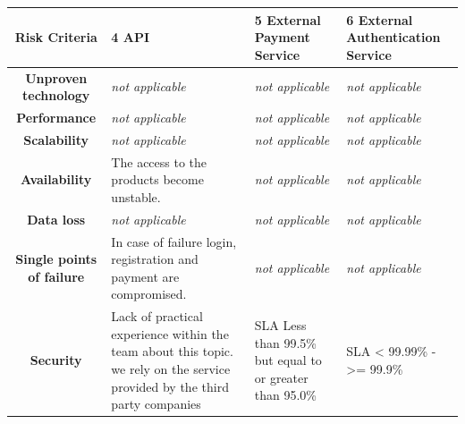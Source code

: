 \begin{table}[H]
    \begin{tabularx}{\textwidth}{|c|X|X|X|}
        \toprule
        \textbf{Risk Criteria} & \textbf{4 API} & \textbf{5 External Payment Service} & \textbf{6 External Authentication Service} \\
        \midrule
        \textbf{Unproven technology} & \textit{not applicable} & \textit{not applicable}  & \textit{not applicable}  \\
        \hline
        \textbf{Performance} & \textit{not applicable} & \textit{not applicable}  & \textit{not applicable} \\
        \hline
        \textbf{Scalability} & \textit{not applicable} & \textit{not applicable} & \textit{not applicable} \\
        \hline
        \textbf{Availability} & The access to the products become unstable. & \textit{not applicable} & \textit{not applicable} \\
        \hline
        \textbf{Data loss} & \textit{not applicable} & \textit{not applicable} & \textit{not applicable} \\
        \hline
        \textbf{Single points of failure} & In case of failure login, registration and payment are compromised. & \textit{not applicable} & \textit{not applicable} \\
        \hline
        \textbf{Security} & Lack of practical experience within the team about this topic. we rely on the service provided by the third party companies 
        & SLA Less than 99.5\% but equal to or greater than 95.0\% \cite{refmisc:paycSLA} & SLA < 99.99\% - >= 99.9\% \cite{refmisc:auth0sla}	\\
        \bottomrule
    \end{tabularx}
\end{table}
%